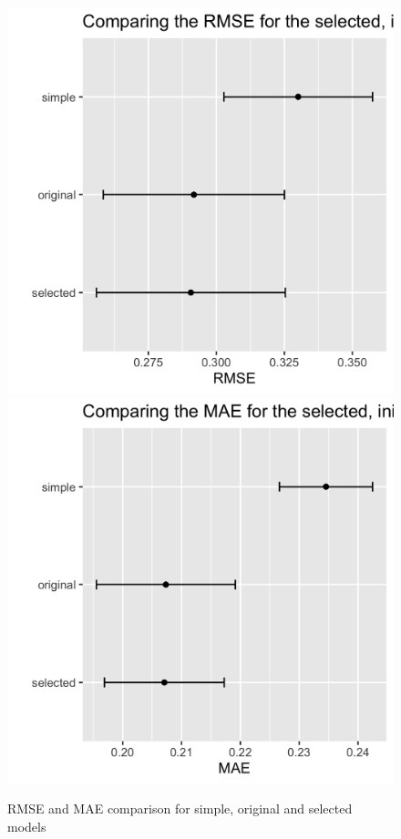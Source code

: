 \documentclass[letterpaper,8pt,twocolumn,twoside,]{pinp}
\begin{document}
\begin{figure}[h]

{\centering \includegraphics[width=0.49\linewidth]{plot10} \includegraphics[width=0.49\linewidth]{plot11} 

}

\caption{RMSE and MAE comparison for simple, original and selected models}\label{fig:unnamed-chunk-6}
\end{figure}
\end{document}
